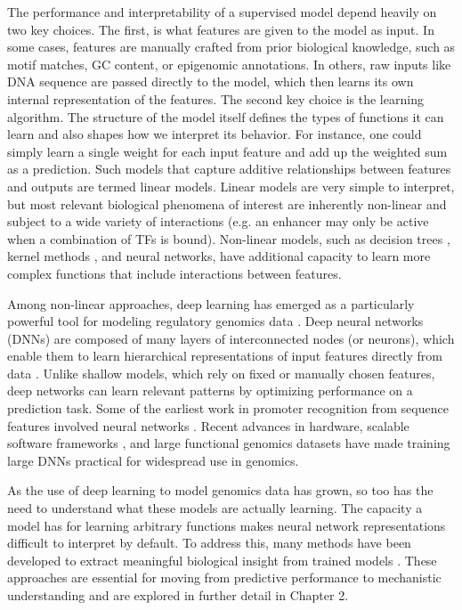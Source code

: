 \begin{dissertationintroduction}
The performance and interpretability of a supervised model depend heavily on two key choices. The first, is what features are given to the model as input. In some cases, features are manually crafted from prior biological knowledge, such as motif matches, GC content, or epigenomic annotations. In others, raw inputs like DNA sequence are passed directly to the model, which then learns its own internal representation of the features. The second key choice is the learning algorithm. The structure of the model itself defines the types of functions it can learn and also shapes how we interpret its behavior. For instance, one could simply learn a single weight for each input feature and add up the weighted sum as a prediction. Such models that capture additive relationships between features and outputs are termed linear models. Linear models are very simple to interpret, but most relevant biological phenomena of interest are inherently non-linear and subject to a wide variety of interactions (e.g. an enhancer may only be active when a combination of TFs is bound). Non-linear models, such as decision trees \cite{Rokach2006-hf}, kernel methods \cite{Ghandi2014-hn,Hofmann2007-sl}, and neural networks, have additional capacity to learn more complex functions that include interactions between features. 

Among non-linear approaches, deep learning has emerged as a particularly powerful tool for modeling regulatory genomics data \cite{Eraslan2019-ye}. Deep neural networks (DNNs) are composed of many layers of interconnected nodes (or neurons), which enable them to learn hierarchical representations of input features directly from data \cite{LeCun2015-fx}. Unlike shallow models, which rely on fixed or manually chosen features, deep networks can learn relevant patterns by optimizing performance on a prediction task. Some of the earliest work in promoter recognition from sequence features involved neural networks \cite{Lukashin1989-wi,O-Neill1991-dh}. Recent advances in hardware, scalable software frameworks \cite{Paszke2019-fm}, and large functional genomics datasets have made training large DNNs practical for widespread use in genomics.

As the use of deep learning to model genomics data has grown, so too has the need to understand what these models are actually learning. The capacity a model has for learning arbitrary functions makes neural network representations difficult to interpret by default. To address this, many methods have been developed to extract meaningful biological insight from trained models \cite{Novakovsky2022-ft,Shrikumar2017-og,Lundberg2017-hh,Talukder2021-wj,Koo2020-vz}. These approaches are essential for moving from predictive performance to mechanistic understanding and are explored in further detail in Chapter 2.


\end{dissertationintroduction}
